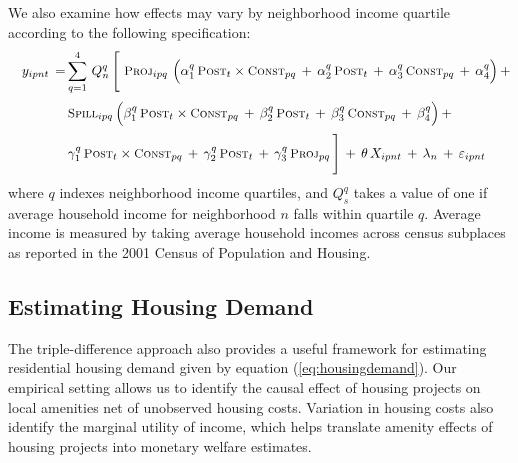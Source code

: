 \documentclass[12pt]{article}
\begin{document}
We also examine how effects may vary by neighborhood income quartile according to the following specification:
\begin{align}\label{eq:mainhet}
\begin{split}
\quad y_{ipnt} \, =& \sum_{q=1}^{4} \, Q_{n}^{q} \, \Bigg[ \,  \,   \textsc{\small Proj}_{ipq} \,\, \Big( \alpha_1^q \, \textsc{\small Post}_{t}\times\textsc{\small Const}_{pq} \, + \, \alpha_2^q \, \textsc{\small Post}_{t} \, + \, \alpha_3^q \, \textsc{\small Const}_{pq}\, +\, \alpha_4^q \Big) \, + \\[.2em]
& \, \textsc{\small Spill}_{ipq} \, \Big( \beta_1^q \, \textsc{\small Post}_{t}\times\textsc{\small Const}_{pq} \, + \, \beta_2^q \, \textsc{\small Post}_{t} \, + \, \beta_3^q \, \textsc{\small Const}_{pq} \, +\, \beta_4^q \Big) \, + \\[.2em]
& \, \gamma_1^q \,  \textsc{\small Post}_{t}\times\textsc{\small Const}_{pq} \, + \, \gamma_2^q \,\textsc{\small Post}_{t} \, + \, \gamma_3^q \,  \textsc{\small Proj}_{pq} \, \Bigg] \, + \, \theta \, X_{ipnt} \, + \, \lambda_n \, + \, \varepsilon_{ipnt} \quad 
\end{split}
\end{align}
\noindent where $q$ indexes neighborhood income quartiles, and $Q_s^q$ takes a value of one if average household income for neighborhood $n$ falls within quartile $q$.  Average income is measured by taking average household incomes across census subplaces as reported in the 2001 Census of Population and Housing.  



\subsection{Estimating Housing Demand}


The triple-difference approach also provides a useful framework for estimating residential housing demand given by equation (\ref{eq:housingdemand}).  Our empirical setting allows us to identify the causal effect of housing projects on local amenities net of unobserved housing costs.  Variation in housing costs also identify the marginal utility of income, which helps translate amenity effects of housing projects into monetary welfare estimates.
\end{document}
